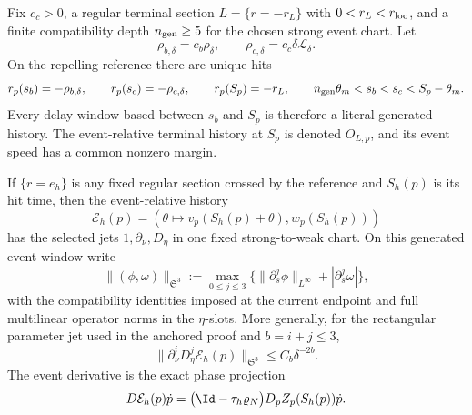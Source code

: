 \begin{proposition}
Fix \(c_c>0\), a regular terminal section
\(L=\{r=-r_L\}\) with \(0<r_L<r_{\rm loc}\), and a finite compatibility
depth \(n_{\rm gen}\ge5\) for the chosen strong event chart.  Let
\begin{equation}
 \rho_{b,\delta}=c_b\rho_\delta,
 \qquad \rho_{c,\delta}=c_c\delta\mathscr L_\delta.
 \label{eq:anchor-toolkit-core-sections}
\end{equation}
On the repelling reference there are unique hits
\begin{equation}
 r_p(s_b)=-\rho_{b,\delta},\qquad
 r_p(s_c)=-\rho_{c,\delta},\qquad
 r_p(S_p)=-r_L,\qquad
 n_{\rm gen}\theta_m<s_b<s_c<S_p-\theta_m.
 \label{eq:anchor-toolkit-generated-hits}
\end{equation}
Every delay window based between \(s_b\) and \(S_p\) is therefore a literal
generated history.  The event-relative terminal history at \(S_p\) is
denoted \(O_{L,p}\), and its event speed has a common nonzero margin.

If \(\{r=e_h\}\) is any fixed regular section crossed by the reference and
\(S_h(p)\) is its hit time, then the event-relative history
\begin{equation}
 \mathcal E_h(p)=
 \left(\theta\mapsto v_p(S_h(p)+\theta),w_p(S_h(p))\right)
 \label{eq:anchor-toolkit-event-hit}
\end{equation}
has the selected jets \(1,\partial_\nu,D_\eta\) in one fixed strong-to-weak
chart.  On this generated event window write
\[
 \|(\phi,\omega)\|_{\mathfrak S^3}
 :=\max_{0\le j\le3}
   \{\|\partial_s^j\phi\|_{L^\infty}+|\partial_s^j\omega|\},
\]
with the compatibility identities imposed at the current endpoint and full
multilinear operator norms in the \(\eta\)-slots.  More generally, for the rectangular parameter jet used in the
anchored proof and \(b=i+j\le3\),
\begin{equation}
 \|\partial_\nu^iD_\eta^j\mathcal E_h(p)\|_{\mathfrak S^3}
 \le C_b\delta^{-2b}.
 \label{eq:anchor-toolkit-event-jets}
\end{equation}
The event derivative is the exact phase projection
\begin{equation}
 D\mathcal E_h(p)\dot p
 =\bigl(\Id-\tau_h\varrho_N\bigr)
       D_pZ_p(S_h(p))\dot p.
 \label{eq:anchor-toolkit-event-derivative}
\end{equation}
\end{proposition}

